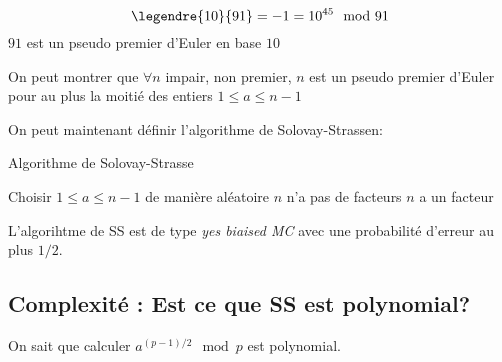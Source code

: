 \documentclass[a4paper, 10pt]{thesis}
\begin{document}
\begin{ex}
    \begin{displaymath}
        \legendre{10}{91} = -1 = 10^{45} \mod 91
    \end{displaymath}
    $91$ est un pseudo premier d'Euler en base $10$
\end{ex}

\begin{rq}
    On peut montrer que $\forall n$ impair, non premier, $n$ est un pseudo premier d'Euler pour au
    plus la moitié des entiers $1 \leq a \leq n-1$
\end{rq}

On peut maintenant définir l'algorithme de Solovay-Strassen:
\begin{algorithm}[h!]
    \caption{Algorithme de Solovay-Strasse}
    \label{solovay-strassen}
    \begin{algorithmic}[1]
            \State Choisir $1 \leq a \leq n-1$ de manière aléatoire
                \State \Return $n$ n'a pas de facteurs
            \Else
                \State \Return $n$ a un facteur
            \EndIf
        \EndFunction
    \end{algorithmic}
\end{algorithm}
            
\begin{prop}
    L'algorihtme de SS est de type \emph{yes biaised MC} avec une probabilité d'erreur au plus
    $1/2$.
\end{prop}

\subsection{Complexité : Est ce que SS est polynomial?}

On sait que calculer $a^{(p-1) / 2} \mod p$ est polynomial.
\end{document}
